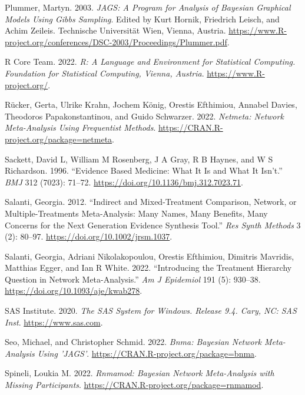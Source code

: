 \begin{CSLReferences}{1}{0}
\leavevmode{}%
Plummer, Martyn. 2003. \emph{JAGS: A Program for Analysis of Bayesian Graphical Models Using Gibbs Sampling}. Edited by Kurt Hornik, Friedrich Leisch, and Achim Zeileis. Technische Universität Wien, Vienna, Austria. \url{https://www.R-project.org/conferences/DSC-2003/Proceedings/Plummer.pdf}.

\leavevmode{}%
R Core Team. 2022. \emph{{R: A Language and Environment for Statistical Computing}. Foundation for Statistical Computing, Vienna, Austria}. \url{https://www.R-project.org/}.

\leavevmode{}%
Rücker, Gerta, Ulrike Krahn, Jochem König, Orestis Efthimiou, Annabel Davies, Theodoros Papakonstantinou, and Guido Schwarzer. 2022. \emph{Netmeta: Network Meta-Analysis Using Frequentist Methods}. \url{https://CRAN.R-project.org/package=netmeta}.

\leavevmode{}%
Sackett, David L, William M Rosenberg, J A Gray, R B Haynes, and W S Richardson. 1996. {``Evidence Based Medicine: What It Is and What It Isn't.''} \emph{BMJ} 312 (7023): 71--72. \url{https://doi.org/10.1136/bmj.312.7023.71}.

\leavevmode{}%
Salanti, Georgia. 2012. {``Indirect and Mixed-Treatment Comparison, Network, or Multiple-Treatments Meta-Analysis: Many Names, Many Benefits, Many Concerns for the Next Generation Evidence Synthesis Tool.''} \emph{Res Synth Methods} 3 (2): 80--97. \url{https://doi.org/10.1002/jrsm.1037}.

\leavevmode{}%
Salanti, Georgia, Adriani Nikolakopoulou, Orestis Efthimiou, Dimitris Mavridis, Matthias Egger, and Ian R White. 2022. {``Introducing the Treatment Hierarchy Question in Network Meta-Analysis.''} \emph{Am J Epidemiol} 191 (5): 930--38. \url{https://doi.org/10.1093/aje/kwab278}.

\leavevmode{}%
SAS Institute. 2020. \emph{{The SAS System for Windows}. Release 9.4. Cary, NC: SAS Inst}. \url{https://www.sas.com}.

\leavevmode{}%
Seo, Michael, and Christopher Schmid. 2022. \emph{Bnma: Bayesian Network Meta-Analysis Using 'JAGS'}. \url{https://CRAN.R-project.org/package=bnma}.

\leavevmode{}%
Spineli, Loukia M. 2022. \emph{Rnmamod: Bayesian Network Meta-Analysis with Missing Participants}. \url{https://CRAN.R-project.org/package=rnmamod}.


\end{CSLReferences}
